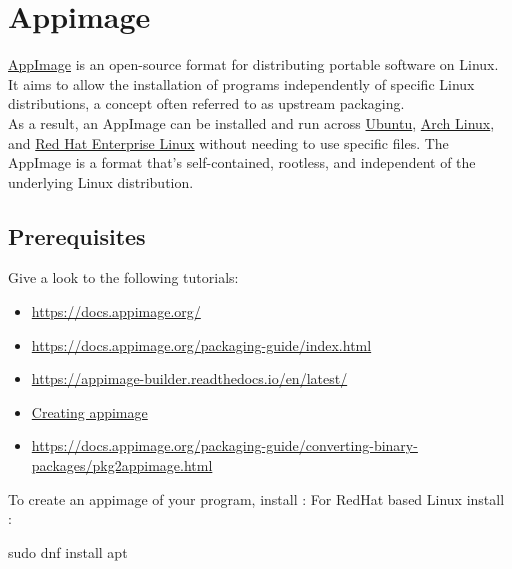 \newcommand{\abuild}{\bftt{appimage-builder}}
\newcommand{\pbuild}{\bftt{pkg2appimage}}

\section{Appimage}

\href{https://appimage.org/}{AppImage} is an open-source format for distributing portable software on Linux.  
It aims to allow the installation of programs independently of specific Linux distributions, a concept often referred to as upstream packaging. \\
As a result, an AppImage can be installed and run across \href{https://ubuntu.com}{Ubuntu}, \href{https://archlinux.org}{Arch Linux}, and \href{https://www.redhat.com}{Red Hat Enterprise Linux} without needing to use specific files. 
The AppImage is a format that's self-contained, rootless, and independent of the underlying Linux distribution. 

\subsection{Prerequisites}

Give a look to the following tutorials:
\begin{itemize}
\item \href{https://docs.appimage.org/}{https://docs.appimage.org/}
\item \href{https://docs.appimage.org/packaging-guide/index.html}{https://docs.appimage.org/packaging-guide/index.html}
\item \href{https://appimage-builder.readthedocs.io/en/latest/}{https://appimage-builder.readthedocs.io/en/latest/}
\item \href{https://github.com/AppImage/AppImageKit/wiki/Creating-AppImages/cc2441518975caca23e9ce2dba6f08a22c678d1e}{Creating appimage}
\item \href{https://docs.appimage.org/packaging-guide/converting-binary-packages/pkg2appimage.html}{https://docs.appimage.org/packaging-guide/converting-binary-packages/pkg2appimage.html}
\end{itemize}
\vspace{0.25cm}
To create an appimage of your program, install \abuild:
{}
For RedHat based Linux install :
\begin{script}
\fprompt{~} sudo dnf install apt
\end{script}
\newpage
